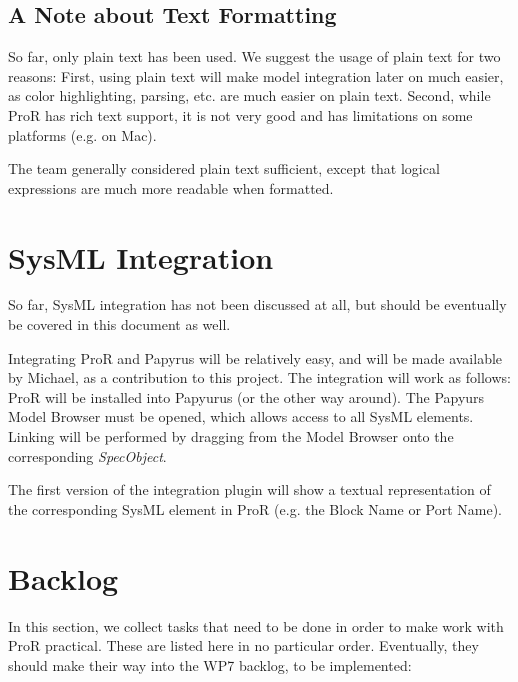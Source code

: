 \documentclass{template/openetcs_article}
\begin{document}
\subsection{A Note about Text Formatting}

So far, only plain text has been used.  We suggest the usage of plain text for two reasons: First, using plain text will make model integration later on much easier, as color highlighting, parsing, etc. are much easier on plain text.  Second, while ProR has rich text support, it is not very good and has limitations on some platforms (e.g. on Mac).

The team generally considered plain text sufficient, except that logical expressions are much more readable when formatted.

\section{SysML Integration}

So far, SysML integration has not been discussed at all, but should be eventually be covered in this document as well.

Integrating ProR and Papyrus will be relatively easy, and will be made available by Michael, as a contribution to this project.  The integration will work as follows: ProR will be installed into Papyurus (or the other way around).  The Papyurs Model Browser must be opened, which allows access to all SysML elements.  Linking will be performed by dragging from the Model Browser onto the corresponding \emph{SpecObject}.

The first version of the integration plugin will show a textual representation of the corresponding SysML element in ProR (e.g. the Block Name or Port Name).

\section{Backlog}

In this section, we collect tasks that need to be done in order to make work with ProR practical.  These are listed here in no particular order.  Eventually, they should make their way into the WP7 backlog, to be implemented:
\end{document}
